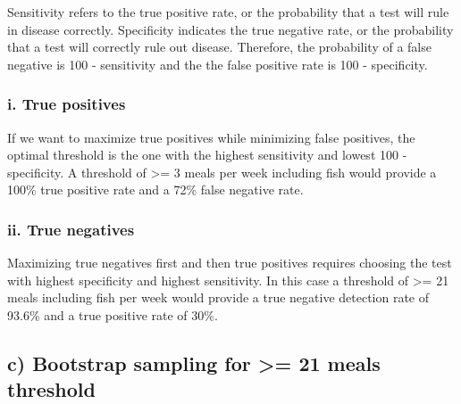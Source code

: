 \documentclass[]{article}
\begin{document}
Sensitivity refers to the true positive rate, or the probability that a
test will rule in disease correctly. Specificity indicates the true
negative rate, or the probability that a test will correctly rule out
disease. Therefore, the probability of a false negative is 100 -
sensitivity and the the false positive rate is 100 - specificity.

\hypertarget{i.-true-positives}{%
\subsubsection{i. True positives}\label{i.-true-positives}}

If we want to maximize true positives while minimizing false positives,
the optimal threshold is the one with the highest sensitivity and lowest
100 - specificity. A threshold of \textgreater{}= 3 meals per week
including fish would provide a 100\% true positive rate and a 72\% false
negative rate.

\hypertarget{ii.-true-negatives}{%
\subsubsection{ii. True negatives}\label{ii.-true-negatives}}

Maximizing true negatives first and then true positives requires
choosing the test with highest specificity and highest sensitivity. In
this case a threshold of \textgreater{}= 21 meals including fish per
week would provide a true negative detection rate of 93.6\% and a true
positive rate of 30\%.

\hypertarget{c-bootstrap-sampling-for-21-meals-threshold}{%
\subsection{c) Bootstrap sampling for \textgreater{}= 21 meals
threshold}\label{c-bootstrap-sampling-for-21-meals-threshold}}
\end{document}
